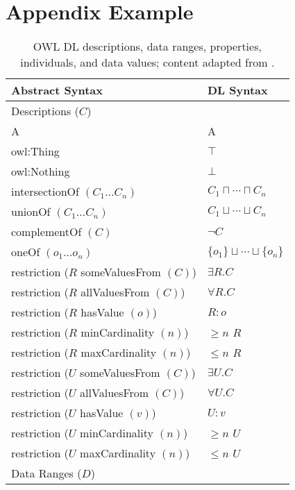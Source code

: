 
\chapter{Appendix Example}
\label{chap:AppendixA}

\begin{table}[h]
\centering
\renewcommand{\arraystretch}{1}
\caption{OWL DL descriptions, data ranges, properties, individuals, and data values; content adapted from \cite{Baader2003}.}
\begin{tabular}{|p{10cm}|p{5cm}|}
	\multicolumn{1}{l}{\textbf{Abstract Syntax}}
	& \multicolumn{1}{l}{\textbf{DL Syntax}}\\
			\hline
			Descriptions ($C$) & {}\\
			\hline
			A & A\\
			owl:Thing & $\top$\\
			owl:Nothing & $\bot$\\
		 \hline
			intersectionOf $(C_{1}\ldots C_{n})$ & $C_{1}\sqcap \cdots \sqcap C_{n}$ \\
			unionOf $(C_{1}\ldots C_{n})$ & $C_{1}\sqcup \cdots \sqcup C_{n}$ \\
			complementOf $(C)$ & $\neg C$\\
			oneOf $(o_{1} \ldots o_{n})$ & $\{o_{1}\} \sqcup \cdots \sqcup \{o_{n}\}$\\
			\hline
			restriction ($R$ someValuesFrom $(C)$) & $\exists R.C$ \\
			restriction ($R$ allValuesFrom $(C)$) & $\forall R.C$ \\
			restriction ($R$ hasValue $(o)$) & $R:o$ \\
			restriction ($R$ minCardinality $(n)$) & $\ge n$ $R$ \\
			restriction ($R$ maxCardinality $(n)$) & $\le n$ $R$ \\
			\hline
			restriction ($U$ someValuesFrom $(C)$) & $\exists U.C$ \\
			restriction ($U$ allValuesFrom $(C)$) & $\forall U.C$ \\
			restriction ($U$ hasValue $(v)$) & $U:v$ \\
			restriction ($U$ minCardinality $(n)$) & $\ge n$ $U$ \\
			restriction ($U$ maxCardinality $(n)$) & $\le n$ $U$ \\
			\hline
			\hline
			Data Ranges ($D$) & {}\\

\end{tabular}
\end{table}
